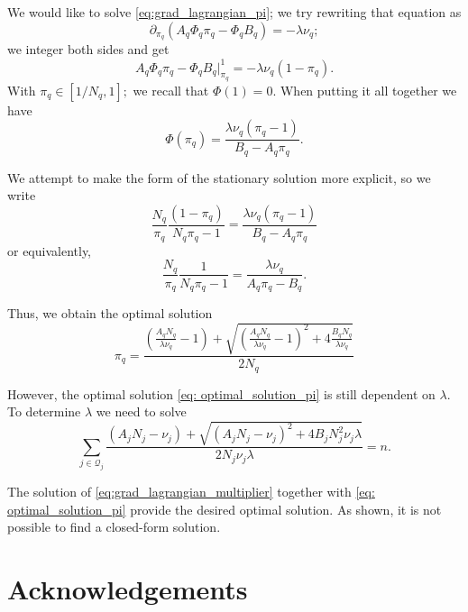 \begin{appendices}
We would like to solve \eqref{eq:grad_lagrangian_pi}; we try rewriting that equation as 
$$\partial_{\pi_q} (A_q \Phi_q \pi_q - \Phi_q B_q) = -\lambda\nu_q;$$
we integer both sides and get
$$A_q \Phi_q \pi_q - \Phi_q B_q \rvert_{\pi_q}^{1} = -\lambda \nu_q(1-\pi_q).$$
With $\pi_q \in [1/N_q, 1];$ we recall that $\Phi(1) = 0.$ 
When putting it all together we have
\begin{equation}\label{eq:sol_grad_pi}
    \Phi(\pi_q) = \frac{\lambda \nu_q (\pi_q-1)}{B_q-A_q\pi_q}.
\end{equation}

We attempt to make the form of the stationary solution more explicit, so we write 
\begin{equation*}
    \frac{N_q}{\pi_q}\frac{(1-\pi_{q})}{N_{q}\pi_{q}-1} = \frac{\lambda \nu_q (\pi_q-1)}{B_q-A_q\pi_q}
\end{equation*}
or equivalently,  
\begin{equation*}
    \frac{N_q}{\pi_q}\frac{1}{N_{q}\pi_{q}-1} = \frac{\lambda \nu_q }{A_q\pi_q-B_q}.
\end{equation*}


Thus, we obtain the optimal solution
\begin{equation}\label{eq: optimal_solution_pi}
    \pi_{q} = \frac{\left(\frac{A_q N_q}{\lambda \nu_q} -1 \right) + \sqrt{\left(\frac{A_q N_q}{\lambda \nu_q} -1 \right)^{2}+4\frac{B_q N_{q}}{\lambda \nu_q}}}{2 N_q}
\end{equation}

However, the optimal solution  \eqref{eq: optimal_solution_pi} is still dependent on $\lambda$.
To determine $\lambda$ we need to solve
\begin{equation}\label{eq:grad_lagrangian_multiplier}
    \sum_{j \in \mathcal{Q}_{j}} \frac{\left(A_{j} N_{j} -\nu_{j} \right) + \sqrt{\left(A_{j} N_{j} -\nu_{j} \right)^{2}+4 B_{j} N^{2}_{j} \nu_{j} \lambda}}{2 N_{j} \nu_{j} \lambda} = n.
\end{equation}

The solution of \eqref{eq:grad_lagrangian_multiplier} together with \eqref{eq: optimal_solution_pi} provide the desired optimal solution.
As shown, it is not possible to find a closed-form solution.



\end{appendices}

\section*{Acknowledgements}

